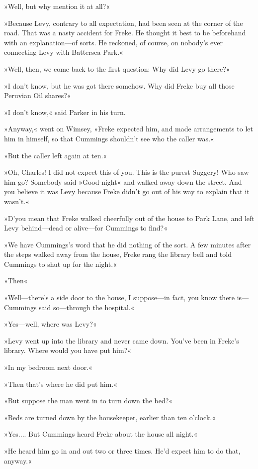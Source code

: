 »Well, but why mention it at all?«

»Because Levy, contrary to all expectation, had been seen at the corner of the road. That was a nasty accident for Freke. He thought it best to be beforehand with an explanation—of sorts. He reckoned, of course, on nobody's ever connecting Levy with Battersea Park.«

»Well, then, we come back to the first question: Why did Levy go there?«

»I don't know, but he was got there somehow. Why did Freke buy all those Peruvian Oil shares?«

»I don't know,« said Parker in his turn.

»Anyway,« went on Wimsey, »Freke expected him, and made arrangements to let him in himself, so that Cummings shouldn't see who the caller was.«

»But the caller left again at ten.«

»Oh, Charles! I did not expect this of you. This is the purest Suggery! Who saw him go? Somebody said »Good-night« and walked away down the street. And you believe it was Levy because Freke didn't go out of his way to explain that it wasn't.«

»D'you mean that Freke walked cheerfully out of the house to Park Lane, and left Levy behind—dead or alive—for Cummings to find?«

»We have Cummings's word that he did nothing of the sort. A few minutes after the steps walked away from the house, Freke rang the library bell and told Cummings to shut up for the night.«

»Then\longdash«

»Well—there's a side door to the house, I suppose—in fact, you know there is—Cummings said so—through the hospital.«

»Yes—well, where was Levy?«

»Levy went up into the library and never came down. You've been in Freke's library. Where would you have put him?«

»In my bedroom next door.«

»Then that's where he did put him.«

»But suppose the man went in to turn down the bed?«

»Beds are turned down by the housekeeper, earlier than ten o'clock.«

»Yes.... But Cummings heard Freke about the house all night.«

»He heard him go in and out two or three times. He'd expect him to do that, anyway.«

